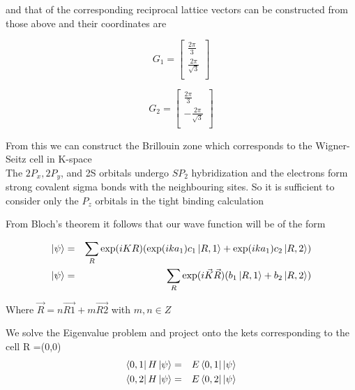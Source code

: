 \documentclass[a4paper]{article}
\begin{document}
and that of the corresponding reciprocal lattice vectors can be constructed from those above and their coordinates are \\
\begin{minipage}{0.5\textwidth}
\centering
\begin{equation*}
G_1 =
\begin{bmatrix}
    \frac{2\pi}{3} \\
    \frac{2\pi}{\sqrt{3}} \\
\end{bmatrix}
\end{equation*}


\end{minipage}
\begin{minipage}{0.5\textwidth}
\centering
\begin{equation*}
G_2 =
\begin{bmatrix}
    \frac{2\pi}{3} \\
    -\frac{2\pi}{\sqrt{3}} \\
\end{bmatrix}
\end{equation*}
\end{minipage}

From this we can construct the Brillouin zone which corresponds to the Wigner-Seitz cell in K-space\\

The $2P_{x}, 2P_{y}$, and 2S orbitals undergo $SP_{2}$ hybridization and the electrons form strong covalent sigma bonds with the neighbouring sites. So it is sufficient to consider only the $P_{z}$ orbitals in the tight binding calculation

From Bloch's theorem it follows that our wave function will be of the form

\begin{eqnarray}
    \ket{\psi}&=&\sum_{R}\exp(iKR)(\exp(ika_{1})c_{1}\ket{R,1} + \exp(ika_{1})c_{2}\ket{R,2} )\\
	\ket{\psi}&=&\sum_{R}\exp(i\vec{K}\vec{R})(b_{1}\ket{R,1} + b_{2}\ket{R,2} )
\end{eqnarray}


Where $\vec{R} = n\vec{R1} + m\vec{R2} $  with $m,n \in Z$


We solve the Eigenvalue problem and project onto the kets corresponding to the cell R =(0,0) 
\begin{eqnarray}
\bra{0,1}H\ket{\psi}&=&E\bra{0,1}\ket{\psi}\\
\bra{0,2}H\ket{\psi}&=&E\bra{0,2}\ket{\psi}
\end{eqnarray}
\end{document}
